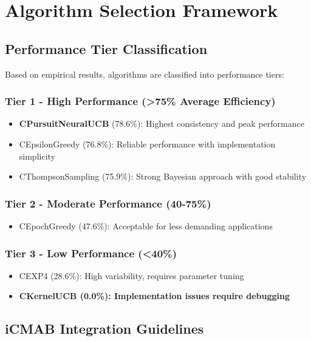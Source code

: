 \documentclass[12pt,a4paper]{article}
\newcommand{\primarytext}[1]{\textcolor{primaryblue}{\textbf{#1}}}
\newcommand{\warning}[1]{\textcolor{warningred}{\textbf{#1}}}
\begin{document}
\section{Algorithm Selection Framework}

\subsection{Performance Tier Classification}

Based on empirical results, algorithms are classified into performance tiers:

\subsubsection{Tier 1 - High Performance (>75\% Average Efficiency)}
\begin{itemize}
\item \primarytext{CPursuitNeuralUCB} (78.6\%): Highest consistency and peak performance
\item CEpsilonGreedy (76.8\%): Reliable performance with implementation simplicity
\item CThompsonSampling (75.9\%): Strong Bayesian approach with good stability
\end{itemize}

\subsubsection{Tier 2 - Moderate Performance (40-75\%)}
\begin{itemize}
\item CEpochGreedy (47.6\%): Acceptable for less demanding applications
\end{itemize}

\subsubsection{Tier 3 - Low Performance (<40\%)}
\begin{itemize}
\item CEXP4 (28.6\%): High variability, requires parameter tuning
\item \warning{CKernelUCB (0.0\%): Implementation issues require debugging}
\end{itemize}

\subsection{iCMAB Integration Guidelines}
\end{document}
